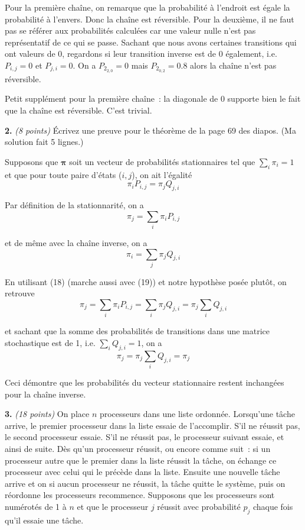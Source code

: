 \documentclass{article}
\begin{document}
Pour la première chaîne, on remarque que la probabilité à l'endroit est égale la probabilité à l'envers. Donc la chaîne est
réversible. Pour la deuxième, il ne faut pas se référer aux probabilités calculées car une valeur nulle n'est pas représentatif 
de ce qui se passe. Sachant que nous avons certaines transitions qui ont valeurs de 0, regardons si leur transition inverse
est de 0 également, i.e. $P_{i,j}=0$ et $P_{j,i}=0$. On a $P_{2_{2,0}}=0$ mais $P_{2_{0,2}}=0.8$ alors la chaîne n'est
pas réversible.

\vspace{.1cm}
Petit supplément pour la première chaîne : la diagonale de 0 supporte bien le fait que la chaîne est réversible. C'est trivial.

\newpage
\noindent \textbf{2.} \textit{(8 points)} Écrivez une preuve pour le 
théorème de la page 69 des diapos. (Ma solution fait 5 lignes.)

\vspace{.2cm}
Supposons que $\boldsymbol{\pi}$ soit un vecteur de probabilités
stationnaires tel que $\sum_i\pi_i=1$ et que pour toute paire d'états
($i,j$), on ait l'égalité
\begin{equation}
    \pi_iP_{i,j}=\pi_jQ_{j,i}
\end{equation}

Par définition de la stationnarité, on a
\begin{equation}
    \pi_j=\sum_i\pi_iP_{i,j}
\end{equation}

et de même avec la chaîne inverse, on a
\begin{equation}
    \pi_i=\sum_j\pi_jQ_{j,i}
\end{equation}

En utilisant (18) (marche aussi avec (19)) et notre hypothèse posée 
plutôt, on retrouve
\[
    \pi_j=\sum_i\pi_iP_{i,j}=\sum_i\pi_jQ_{j,i}=\pi_j\sum_iQ_{j,i}
\]

et sachant que la somme des probabilités de transitions dans une matrice
stochastique est de 1, i.e. $\sum_iQ_{j,i}=1$, on a
\[
    \pi_j=\pi_j\sum_iQ_{j,i}=\pi_j
\]

Ceci démontre que les probabilités du vecteur stationnaire restent
inchangées pour la chaîne inverse.


\newpage
\noindent \textbf{3.} \textit{(18 points)} On place $n$ processeurs 
dans une liste ordonnée. Lorsqu'une tâche arrive, le premier processeur 
dans la liste essaie de l'accomplir. S'il ne réussit pas, le second 
processeur essaie. S'il ne réussit pas, le processeur suivant essaie, 
et ainsi de suite. Dès qu'un processeur réussit, ou encore comme suit : 
si un processeur autre que le premier dans la liste réussit la tâche, 
on échange ce processeur avec celui qui le précède dans la liste. 
Ensuite une nouvelle tâche arrive et on si aucun processeur ne réussit, 
la tâche quitte le système, puis on réordonne les processeurs recommence. 
Supposons que les processeurs sont numérotés de 1 à $n$ et que le 
processeur $j$ réussit avec probabilité $p_j$ chaque fois qu'il essaie 
une tâche. \\
\end{document}
